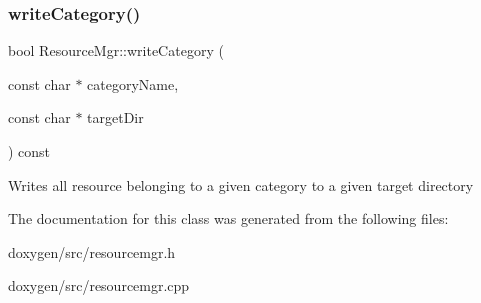 \subsubsection{\texorpdfstring{writeCategory()}{writeCategory()}}
{\footnotesize\ttfamily bool Resource\+Mgr\+::write\+Category (\begin{DoxyParamCaption}\item[{const char $\ast$}]{category\+Name,  }\item[{const char $\ast$}]{target\+Dir }\end{DoxyParamCaption}) const}

Writes all resource belonging to a given category to a given target directory 

The documentation for this class was generated from the following files\+:\begin{DoxyCompactItemize}
\item 
doxygen/src/resourcemgr.\+h\item 
doxygen/src/resourcemgr.\+cpp\end{DoxyCompactItemize}
